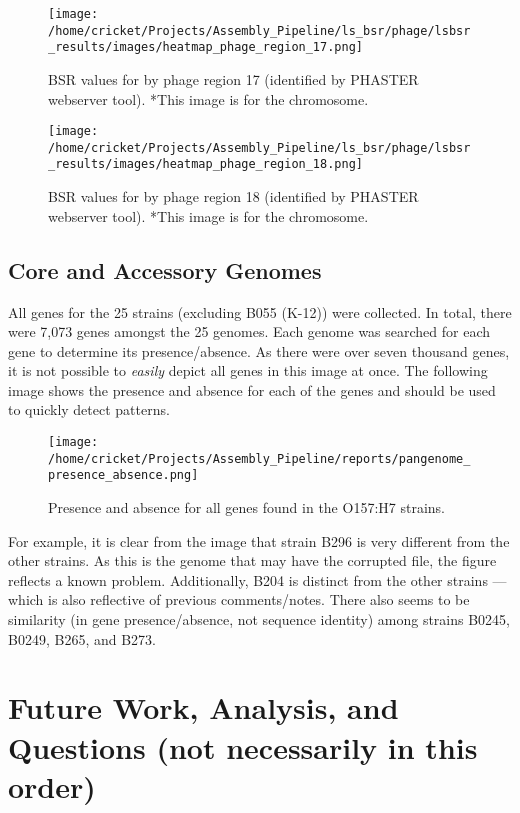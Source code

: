 \documentclass[11pt]{article}
\begin{document}
\begin{figure}[ht!]\normalsize %
\centering
\texttt{[image: /home/cricket/Projects/Assembly\_Pipeline/ls\_bsr/phage/lsbsr\_results/images/heatmap\_phage\_region\_17.png]} 
\caption{BSR values for by phage region 17 (identified by PHASTER webserver tool). *This image is for the chromosome.}
\label{phage_17}
\end{figure}

\clearpage

\begin{figure}[ht!]\normalsize %
\centering
\texttt{[image: /home/cricket/Projects/Assembly\_Pipeline/ls\_bsr/phage/lsbsr\_results/images/heatmap\_phage\_region\_18.png]} 
\caption{BSR values for by phage region 18 (identified by PHASTER webserver tool). *This image is for the chromosome.}
\label{phage_18}
\end{figure}
\clearpage

\subsection*{Core and Accessory Genomes}
All genes for the 25 strains (excluding B055 (K-12)) were collected. In total, there were 7,073 genes amongst the 25 genomes. Each genome was searched for each gene to determine its presence/absence. As there were over seven thousand genes, it is not possible to \textit{easily} depict all genes in this image at once. The following image shows the presence and absence for each of the genes and should be used to quickly detect patterns.  

\begin{figure}[ht!]\normalsize %
\centering
\texttt{[image: /home/cricket/Projects/Assembly\_Pipeline/reports/pangenome\_presence\_absence.png]}
\caption{Presence and absence for all genes found in the O157:H7 strains.}
\label{presence_absence}
\end{figure}

For example, it is clear from the image that strain B296 is very different from the other strains. As this is the genome that may have the corrupted file, the figure reflects a known problem. Additionally, B204 is distinct from the other strains --- which is also reflective of previous comments/notes. There also seems to be similarity (in gene presence/absence, not sequence identity) among strains B0245, B0249, B265, and B273.

\section*{Future Work, Analysis, and Questions (not necessarily in this order)}
\end{document}
